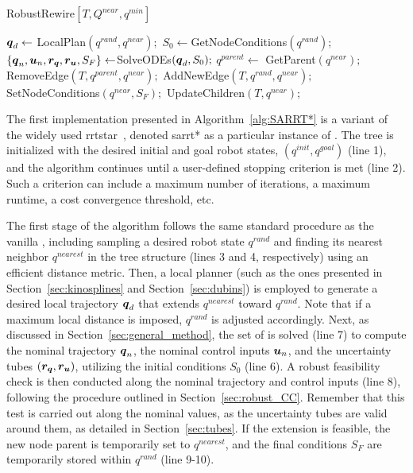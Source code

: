 \begin{algorithm}[htp]
    \caption{RobustRewire$[T, Q^{near}, q^{min}]$}\label{alg:RobustRewire}
    \begin{algorithmic}[1]
            \State $\boldsymbol{q}_d \gets$ LocalPlan$(q^{rand}, q^{near});$
            \State $S_0 \gets $GetNodeConditions$({q^{rand}});$
            \State $\left \{\boldsymbol{q}_n, \boldsymbol{u}_n, \boldsymbol{r_q}, \boldsymbol{r_u}, S_F \right \}  \gets $SolveODEs$(\boldsymbol{q}_d, S_0);$
                    \State $q^{parent} \gets$ GetParent$(q^{near});$
                    \State RemoveEdge$(T, q^{parent}, q^{near});$
                    \State AddNewEdge$(T, q^{rand}, q^{near});$
                    \State SetNodeConditions$(q^{near}, S_{F});$
                    \State UpdateChildren$(T, q^{near});$
                \EndIf
            \EndIf
        \EndFor
    \end{algorithmic}
\end{algorithm}

The first implementation presented in Algorithm~\ref{alg:SARRT*} is a variant of the widely used \gls{rrtstar}~\cite{cRRTstar}, denoted \gls{sarrt*} as a particular instance of .
The tree is initialized with the desired initial and goal robot states, $(q^{init}, q^{goal})$ (line 1), and the algorithm continues until a user-defined stopping criterion is met (line 2).
Such a criterion can include a maximum number of iterations, a maximum runtime, a cost convergence threshold, etc.

The first stage of the algorithm follows the same standard procedure as the vanilla , including sampling a desired robot state $q^{rand}$ and finding its nearest neighbor $q^{nearest}$ in the tree structure (lines 3 and 4, respectively) using an efficient distance metric.
Then, a local planner (such as the ones presented in Section~\ref{sec:kinosplines} and Section~\ref{sec:dubins}) is employed to generate a desired local trajectory $\boldsymbol{q}_d$ that extends $q^{nearest}$ toward $q^{rand}$.
Note that if a maximum local distance is imposed, $q^{rand}$ is adjusted accordingly.
Next, as discussed in Section~\ref{sec:general_method}, the set of  is solved (line 7) to compute the nominal trajectory $\boldsymbol{q}_n$, the nominal control inputs $\boldsymbol{u}_n$, and the uncertainty tubes $(\boldsymbol{r_q}, \boldsymbol{r_u})$, utilizing the initial conditions $S_0$ (line 6).
A robust feasibility check is then conducted along the nominal trajectory and control inputs (line 8), following the procedure outlined in Section~\ref{sec:robust_CC}.
Remember that this test is carried out along the nominal values, as the uncertainty tubes are valid around them, as detailed in Section~\ref{sec:tubes}.
If the extension is feasible, the new node parent is temporarily set to $q^{nearest}$, and the final conditions $S_F$ are temporarily stored within $q^{rand}$ (line 9-10).

